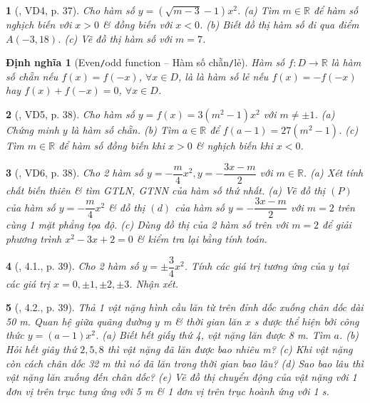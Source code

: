 \documentclass{article}
\newtheorem{baitoan}{}
\newtheorem{dinhnghia}{Định nghĩa}
\begin{document}
\begin{baitoan}[\cite{Binh_boi_duong_Toan_9_tap_2}, VD4, p. 37]
	Cho hàm số $y = (\sqrt{m - 3} - 1)x^2$. (a) Tìm $m\in\mathbb{R}$ để hàm số nghịch biến với $x > 0$ \& đồng biến với $x < 0$. (b) Biết đồ thị hàm số đi qua điểm $A(-3,18)$. (c) Vẽ đồ thị hàm số với $m = 7$.
\end{baitoan}

\begin{dinhnghia}[Even{\tt/}odd function -- Hàm số chẵn{\tt/}lẻ]
	Hàm số $f:D\to\mathbb{R}$ là {\rm hàm số chẵn} nếu $f(x) = f(-x)$, $\forall x\in D$, là là {\rm hàm số lẻ} nếu $f(x) = -f(-x)$ hay $f(x) + f(-x) = 0$, $\forall x\in D$.
\end{dinhnghia}

\begin{baitoan}[\cite{Binh_boi_duong_Toan_9_tap_2}, VD5, p. 38]
	Cho hàm số $y = f(x) = 3(m^2 - 1)x^2$ với $m\ne\pm1$. (a) Chứng minh $y$ là hàm số chẵn. (b) Tìm $a\in\mathbb{R}$ để $f(a - 1) = 27(m^2 - 1)$. (c) Tìm $m\in\mathbb{R}$ để hàm số đồng biến khi $x > 0$ \& nghịch biến khi $x < 0$.
\end{baitoan}

\begin{baitoan}[\cite{Binh_boi_duong_Toan_9_tap_2}, VD6, p. 38]
	Cho 2 hàm số $y = -\dfrac{m}{4}x^2,y = -\dfrac{3x - m}{2}$ với $m\in\mathbb{R}$. (a) Xét tính chất biến thiên \& tìm {\rm GTLN, GTNN} của hàm số thứ nhất. (a) Vẽ đồ thị $(P)$ của hàm số $y = -\dfrac{m}{4}x^2$ \& đồ thị $(d)$ của hàm số $y = -\dfrac{3x - m}{2}$ với $m = 2$ trên cùng 1 mặt phẳng tọa độ. (c) Dùng đồ thị của 2 hàm số trên với $m = 2$ để giải phương trình $x^2 - 3x + 2 = 0$ \& kiểm tra lại bằng tính toán.
\end{baitoan}

\begin{baitoan}[\cite{Binh_boi_duong_Toan_9_tap_2}, 4.1., p. 39]
	Cho 2 hàm số $y = \pm\dfrac{3}{4}x^2$. Tính các giá trị tương ứng của $y$ tại các giá trị $x = 0,\pm1,\pm2,\pm3$. Nhận xét.
\end{baitoan}

\begin{baitoan}[\cite{Binh_boi_duong_Toan_9_tap_2}, 4.2., p. 39]
	Thả 1 vật nặng hình cầu lăn từ trên đỉnh dốc xuống chân dốc dài {\rm50 m}. Quan hệ giữa quãng đường $y$ {\rm m} \& thời gian lăn $x$ {\rm s} được thể hiện bởi công thức $y = (a - 1)x^2$. (a) Biết hết giấy thứ 4, vật nặng lăn được {\rm8 m}. Tìm $a$. (b) Hỏi hết giây thứ $2,5,8$ thì vật nặng đã lăn được bao nhiêu {\rm m}? (c) Khi vật nặng còn cách chân dốc {\rm32 m} thì nó đã lăn trong thời gian bao lâu? (d) Sao bao lâu thì vật nặng lăn xuống đến chân dốc? (e) Vẽ đồ thị chuyển động của vật nặng với 1 đơn vị trên trục tung ứng với {\rm5 m} \& 1 đơn vị trên trục hoành ứng với {\rm1 s}.
\end{baitoan}
\end{document}
